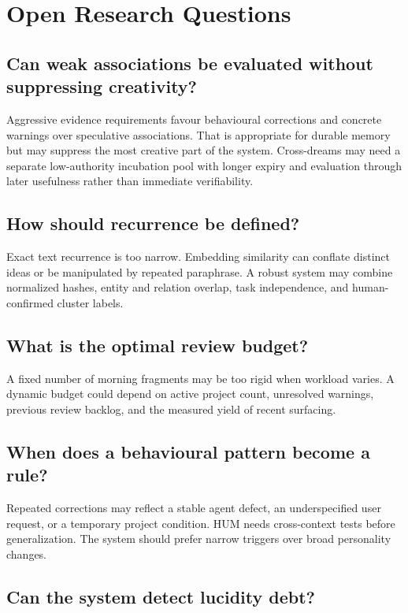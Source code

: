 \documentclass[11pt,a4paper]{article}
\begin{document}
\section{Open Research Questions}

\subsection{Can weak associations be evaluated without suppressing creativity?}

Aggressive evidence requirements favour behavioural corrections and concrete warnings over speculative associations. That is appropriate for durable memory but may suppress the most creative part of the system. Cross-dreams may need a separate low-authority incubation pool with longer expiry and evaluation through later usefulness rather than immediate verifiability.

\subsection{How should recurrence be defined?}

Exact text recurrence is too narrow. Embedding similarity can conflate distinct ideas or be manipulated by repeated paraphrase. A robust system may combine normalized hashes, entity and relation overlap, task independence, and human-confirmed cluster labels.

\subsection{What is the optimal review budget?}

A fixed number of morning fragments may be too rigid when workload varies. A dynamic budget could depend on active project count, unresolved warnings, previous review backlog, and the measured yield of recent surfacing.

\subsection{When does a behavioural pattern become a rule?}

Repeated corrections may reflect a stable agent defect, an underspecified user request, or a temporary project condition. HUM needs cross-context tests before generalization. The system should prefer narrow triggers over broad personality changes.

\subsection{Can the system detect lucidity debt?}
\end{document}
